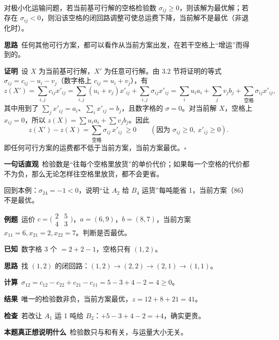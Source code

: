 \begin{theorembox}[最优性判别准则]
对极小化运输问题，若当前基可行解的空格检验数 $\sigma_{ij}\ge0$，则该解为最优解；若存在 $\sigma_{ij}<0$，则沿该空格的闭回路调整可使总运费下降，当前解不是最优（非退化时）。
\end{theorembox}
\begin{proofbox}
\textbf{思路}\ 任何其他可行方案，都可以看作从当前方案出发，在若干空格上“增运”而得到的。\par
\textbf{证明}\ 设 $X$ 为当前基可行解，$X'$ 为任意可行解。由 3.2 节将证明的等式 $\sigma_{ij}=c_{ij}-u_i-v_j$（数字格上 $c_{ij}=u_i+v_j$），有
\[
z(X')=\sum_{i,j}c_{ij}x'_{ij}=\sum_{i,j}(u_i+v_j)x'_{ij}+\sum_{i,j}\sigma_{ij}x'_{ij}
=\sum_i u_ia_i+\sum_j v_jb_j+\sum_{\text{空格}}\sigma_{ij}x'_{ij},
\]
其中用到了 $\sum_j x'_{ij}=a_i$、$\sum_i x'_{ij}=b_j$，且数字格的 $\sigma=0$。对当前解 $X$，空格上 $x_{ij}=0$，所以 $z(X)=\sum u_ia_i+\sum v_jb_j$。因此
\[
z(X')-z(X)=\sum_{\text{空格}}\sigma_{ij}\,x'_{ij}\ \ge 0\qquad(\text{因为 }\sigma_{ij}\ge0,\ x'_{ij}\ge0).
\]
即任何可行方案的运费都不低于当前方案，当前方案最优。\hfill$\square$\par
\textbf{一句话直观}\ 检验数是“往每个空格里放货”的单价代价；如果每一个空格的代价都不为负，那么无论怎样往空格里放货，都不会更省。
\end{proofbox}
回到本例：$\sigma_{24}=-1<0$，说明“让 $A_2$ 给 $B_4$ 运货”每吨能省 1，当前方案（86）不是最优。

\begin{examplebox}[2 × 2 表上的检验数]
\textbf{例题}\ 运价 $c=\bigl(\begin{smallmatrix}2&5\\4&3\end{smallmatrix}\bigr)$，$a=(6,9)$，$b=(8,7)$，当前方案 $x_{11}=6,x_{21}=2,x_{22}=7$。判断是否最优。\par
\begin{minipage}{0.56\linewidth}
\textbf{已知}\ 数字格 3 个 $=2+2-1$，空格只有 $(1,2)$。\par
\textbf{思路}\ 找 $(1,2)$ 的闭回路：$(1,2)\to(2,2)\to(2,1)\to(1,1)$。\par
\textbf{计算}\ $\sigma_{12}=c_{12}-c_{22}+c_{21}-c_{11}=5-3+4-2=4\ge0$。\par
\textbf{结果}\ 唯一的检验数非负，当前方案最优，$z=12+8+21=41$。\par
\textbf{检查}\ 若改让 $A_1$ 运 1 吨给 $B_2$：$+5-3+4-2=+4$，确实更贵。
\end{minipage}\hfill
\begin{minipage}{0.4\linewidth}\centering
{}
\end{minipage}\par
\textbf{本题真正想说明什么}\ 检验数只与和有关，与运量大小无关。
\end{examplebox}

